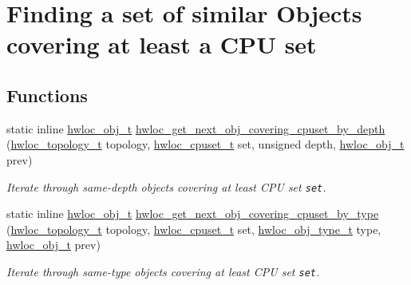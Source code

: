 \hypertarget{group__hwlocality__helper__find__coverings}{
\section{Finding a set of similar Objects covering at least a CPU set}
\label{group__hwlocality__helper__find__coverings}
}
\subsection*{Functions}
\begin{CompactItemize}
\item 
static inline \hyperlink{structhwloc__obj}{hwloc\_\-obj\_\-t} \hyperlink{group__hwlocality__helper__find__coverings_g39cbd3f1608d0fe503d396430cffe219}{hwloc\_\-get\_\-next\_\-obj\_\-covering\_\-cpuset\_\-by\_\-depth} (\hyperlink{group__hwlocality__topology_g9d1e76ee15a7dee158b786c30b6a6e38}{hwloc\_\-topology\_\-t} topology, \hyperlink{group__hwlocality__cpuset_g82e51d695c430832b703dad5ab8d75e4}{hwloc\_\-cpuset\_\-t} set, unsigned depth, \hyperlink{structhwloc__obj}{hwloc\_\-obj\_\-t} prev)
\begin{CompactList}\small\item\em Iterate through same-depth objects covering at least CPU set {\tt set}. \item\end{CompactList}\item 
static inline \hyperlink{structhwloc__obj}{hwloc\_\-obj\_\-t} \hyperlink{group__hwlocality__helper__find__coverings_gad89905a7c9388283535296802d766cb}{hwloc\_\-get\_\-next\_\-obj\_\-covering\_\-cpuset\_\-by\_\-type} (\hyperlink{group__hwlocality__topology_g9d1e76ee15a7dee158b786c30b6a6e38}{hwloc\_\-topology\_\-t} topology, \hyperlink{group__hwlocality__cpuset_g82e51d695c430832b703dad5ab8d75e4}{hwloc\_\-cpuset\_\-t} set, \hyperlink{group__hwlocality__types_gcd37bb612667dc437d66bfb175a8dc55}{hwloc\_\-obj\_\-type\_\-t} type, \hyperlink{structhwloc__obj}{hwloc\_\-obj\_\-t} prev)
\begin{CompactList}\small\item\em Iterate through same-type objects covering at least CPU set {\tt set}. \item\end{CompactList}\end{CompactItemize}


